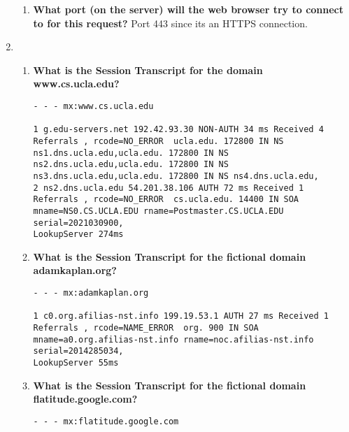 \documentclass{article}
\begin{document}
\begin{enumerate}
\begin{enumerate}
        \item \textbf{What port (on the server) will the web browser try to connect to for this request?} \newline Port 443 since its an HTTPS connection. 
    \end{enumerate}
    \item \begin{enumerate}
        \item \textbf{What is the Session Transcript for the domain www.cs.ucla.edu?} \newline \begin{lstlisting}
- - - mx:www.cs.ucla.edu

1 g.edu-servers.net 192.42.93.30 NON-AUTH 34 ms Received 4 Referrals , rcode=NO_ERROR  ucla.edu. 172800 IN NS ns1.dns.ucla.edu,ucla.edu. 172800 IN NS ns2.dns.ucla.edu,ucla.edu. 172800 IN NS ns3.dns.ucla.edu,ucla.edu. 172800 IN NS ns4.dns.ucla.edu,
2 ns2.dns.ucla.edu 54.201.38.106 AUTH 72 ms Received 1 Referrals , rcode=NO_ERROR  cs.ucla.edu. 14400 IN SOA mname=NS0.CS.UCLA.EDU rname=Postmaster.CS.UCLA.EDU serial=2021030900,
LookupServer 274ms
        \end{lstlisting}
        \item \textbf{What is the Session Transcript for the fictional domain adamkaplan.org?} \newline \begin{lstlisting}
- - - mx:adamkaplan.org

1 c0.org.afilias-nst.info 199.19.53.1 AUTH 27 ms Received 1 Referrals , rcode=NAME_ERROR  org. 900 IN SOA mname=a0.org.afilias-nst.info rname=noc.afilias-nst.info serial=2014285034,
LookupServer 55ms 
       \end{lstlisting}
       \item \textbf{What is the Session Transcript for the fictional domain flatitude.google.com?} \newline \begin{lstlisting}
- - - mx:flatitude.google.com


\end{lstlisting}
\end{enumerate}
\end{enumerate}
\end{document}

